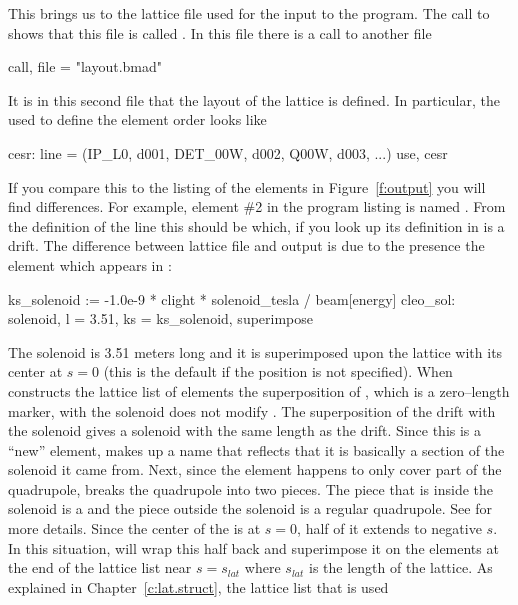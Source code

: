 {{{{{{{{{This brings us to the lattice file used for the input to the program.
The call to  shows that this file is called 
.
In this file there is a call to another file
  \begin{example}
  call, file = "layout.bmad"
  \end{example}
It is in this second file
that the layout of the lattice is defined. In particular, the  used
to define the element order looks like
\begin{example}
  cesr: line = (IP_L0, d001, DET_00W, d002, Q00W, d003, ...)
  use, cesr
\end{example}
If you compare this to the listing of the elements in
Figure~\ref{f:output} you will find differences. For example, element
\#2 in the program listing is named . From the
definition of the  line this should be  which, if
you look up its definition in  is a drift.  The
difference between lattice file and output is due to the presence
the  element which appears in :
\begin{example}
  ks_solenoid    := -1.0e-9 * clight * solenoid_tesla / beam[energy]
  cleo_sol: solenoid, l = 3.51, ks = ks_solenoid, superimpose 
\end{example}
The solenoid is 3.51 meters long
and it is superimposed upon the lattice with its center at $s = 0$ (this
is the default if the position is not specified). 
When  constructs the lattice list of elements
the superposition of , which is a zero--length marker, with the
solenoid does not modify . The superposition of the
 drift with the solenoid gives a solenoid with the same
length as the drift. Since this is a ``new'' element, 
makes up a name that reflects that it is basically a section of the
solenoid it came from.  Next, since the  element happens to
only cover
part of the  quadrupole,  breaks the
quadrupole into two pieces. The piece that is inside the solenoid is a
 and the piece outside the solenoid is a regular
quadrupole. See  for more details. Since the
center of the  is at $s = 0$, half of it extends to
negative $s$. In this situation,  will wrap this half
back and superimpose it on the elements at the end of the lattice list
near $s = s_{lat}$ where $s_{lat}$ is the length of the lattice.  As
explained in Chapter~\ref{c:lat.struct}, the lattice list that is used
}}}}}}}}}
